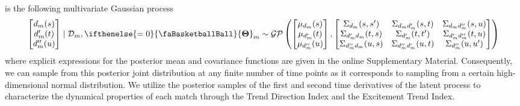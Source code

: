 \documentclass[
  11pt,
]{svjour3}
\theoremstyle{nonumberplain}
\begin{document}
is the following multivariate Gaussian process \begin{align}
\begin{bmatrix}d_m(s)\\ d_m^\prime(t)\\ d_m^{\prime\prime}(u)\end{bmatrix} \mid \mathcal{D}_m, \ifthenelse{\value{bbsym4theta}=0}{\text{\faBasketballBall}}{\mathbf{\Theta}}_m \sim \mathcal{GP}\left(\begin{bmatrix}\mu_{d_m}(s)\\ \mu_{d_m^\prime}(t)\\ \mu_{d_m^{\prime\prime}}(u)\end{bmatrix}, \begin{bmatrix} \Sigma_{d_m}(s, s^\prime) & \Sigma_{d_m d_m^\prime}(s,t) & \Sigma_{d_m d_m^{\prime\prime}}(s,u)\\ \Sigma_{d_m^\prime d_m}(t,s) & \Sigma_{d_m^\prime}(t,t^\prime) & \Sigma_{d_m^\prime d_m^{\prime\prime}}(t,u)\\ \Sigma_{d_m^{\prime\prime} d_m}(u,s) & \Sigma_{d_m^{\prime\prime} d_m^\prime}(u,t) & \Sigma_{d_m^{\prime\prime}}(u,u^\prime)\end{bmatrix}\right)
\label{eq:posterior}
\end{align} where explicit expressions for the posterior mean and
covariance functions are given in the online Supplementary Material.
Consequently, we can sample from this posterior joint distribution at
any finite number of time points as it corresponds to sampling from a
certain high-dimensional normal distribution. We utilize the posterior
samples of the first and second time derivatives of the latent process
to characterize the dynamical properties of each match through the Trend
Direction Index and the Excitement Trend Index.
\end{document}
